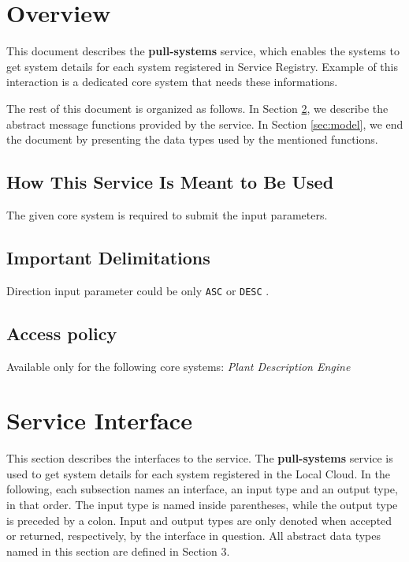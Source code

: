 \documentclass[a4paper]{arrowhead}
\begin{document}
\section{Overview}
\label{sec:overview}
This document describes the \textbf{pull-systems} service, which enables the systems to get system details for each system registered in Service Registry. Example of this interaction is a dedicated core system that needs these informations.

The rest of this document is organized as follows.
In Section \ref{sec:functions}, we describe the abstract message functions provided by the service.
In Section \ref{sec:model}, we end the document by presenting the data types used by the mentioned functions.

\subsection{How This Service Is Meant to Be Used}
The given core system is required to submit the input parameters.

\subsection{Important Delimitations}
\label{sec:delimitations}

Direction input parameter could be only \texttt{ASC} or \texttt{DESC} .

\subsection{Access policy}
\label{sec:accesspolicy}

Available only for the following core systems: \textit{ Plant Description Engine}

\newpage

\section{Service Interface}
\label{sec:functions}

This section describes the interfaces to the service. The \textbf{pull-systems} service is used to get system details for each system registered in the Local Cloud.
In the following, each subsection names an interface, an input type and an output type, in that order.
The input type is named inside parentheses, while the output type is preceded by a colon.
Input and output types are only denoted when accepted or returned, respectively, by the interface in question. All abstract data types named in this section are defined in Section 3.
\end{document}
